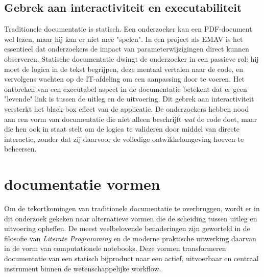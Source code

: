 \section{Gebrek aan interactiviteit en executabiliteit}
Traditionele documentatie is statisch. Een onderzoeker kan een PDF-document wel lezen, maar hij kan er niet mee "spelen". In een project als EMAV is het essentieel dat onderzoekers de impact van parameterwijzigingen direct kunnen observeren. Statische documentatie dwingt de onderzoeker in een passieve rol: hij moet de logica in de tekst begrijpen, deze mentaal vertalen naar de code, en vervolgens wachten op de IT-afdeling om een aanpassing door te voeren.
Het ontbreken van een executabel aspect in de documentatie betekent dat er geen "levende" link is tussen de uitleg en de uitvoering. Dit gebrek aan interactiviteit versterkt het black-box effect van de applicatie. De onderzoekers hebben nood aan een vorm van documentatie die niet alleen beschrijft \textit{wat} de code doet, maar die hen ook in staat stelt om de logica te valideren door middel van directe interactie, zonder dat zij daarvoor de volledige ontwikkelomgeving hoeven te beheersen.
\chapter{documentatie vormen}
Om de tekortkomingen van traditionele documentatie te overbruggen, wordt er in dit onderzoek gekeken naar alternatieve vormen die de scheiding tussen uitleg en uitvoering opheffen. De meest veelbelovende benaderingen zijn geworteld in de filosofie van \textit{Literate Programming} en de moderne praktische uitwerking daarvan in de vorm van computationele notebooks. Deze vormen transformeren documentatie van een statisch bijproduct naar een actief, uitvoerbaar en centraal instrument binnen de wetenschappelijke workflow.
